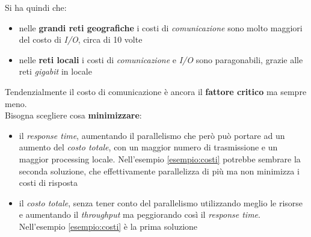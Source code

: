 \documentclass[a4paper,12pt, oneside]{book}
\begin{document}
Si ha quindi che:
\begin{itemize}
  \item nelle \textbf{grandi reti geografiche} i costi di\textit{ comunicazione}
  sono molto maggiori del costo di \textit{I/O}, circa di 10 volte 
  \item nelle \textbf{reti locali} i costi di \textit{comunicazione} e
  \textit{I/O} sono paragonabili, grazie alle reti \textit{gigabit} in locale
\end{itemize}
Tendenzialmente il costo di comunicazione è ancora il \textbf{fattore critico}
ma sempre meno.\\
Bisogna scegliere cosa \textbf{minimizzare}:
\begin{itemize}
  \item il \textit{response time}, aumentando il parallelismo che però può
  portare ad un aumento del \textit{costo totale}, con un maggior numero di
  trasmissione e un maggior processing locale. Nell'esempio \ref{esempio:costi}
  potrebbe sembrare la seconda soluzione, che effettivamente parallelizza di più
  ma non minimizza i costi di risposta 
  \item il \textit{costo totale}, senza tener conto del parallelismo utilizzando
  meglio le risorse e aumentando il \textit{throughput} ma peggiorando così il
  \textit{response time}. Nell'esempio \ref{esempio:costi} è la prima soluzione
\end{itemize}
\end{document}
